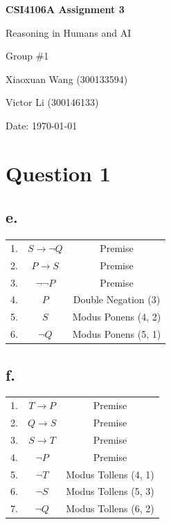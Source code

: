 \documentclass[12pt, a4paper]{article}
\begin{document}
\begin{titlepage}
    \centering
    \vspace*{\fill}
    {\huge\bfseries CSI4106A Assignment 3 \par}
    \vspace{1cm}
    {\Large Reasoning in Humans and AI \par}
    \vspace{2cm}
    {\Large Group \#1 \par}
    \vspace{0.5 cm}
    {\Large Xiaoxuan Wang (300133594) \par}
    {\Large Victor Li (300146133) \par}
    \vspace{2cm}
    {\large Date: \today \par}
    \vspace*{\fill}
\end{titlepage}


\tableofcontents

\newpage
\section*{Question 1}
\subsection*{e.}
\begin{tabular}{ccc}
1. & $S \rightarrow \lnot Q$ & Premise \\
2. & $P \rightarrow S$ & Premise \\
3. & $\lnot\lnot P$ & Premise \\
4. & $P$ & Double Negation (3) \\
5. & $S$ & Modus Ponens (4, 2) \\
6. & $\lnot Q$ & Modus Ponens (5, 1) \\
\end{tabular}

\subsection*{f.}
\begin{tabular}{ccc}
1. & $T \rightarrow P$ & Premise \\
2. & $Q \rightarrow S$ & Premise \\
3. & $S \rightarrow T$ & Premise \\
4. & $\lnot P$ & Premise\\
5. & $\lnot T$ & Modus Tollens (4, 1) \\
6. & $\lnot S$ & Modus Tollens (5, 3) \\
7. & $\lnot Q$ & Modus Tollens (6, 2) \\
\end{tabular}
\end{document}
